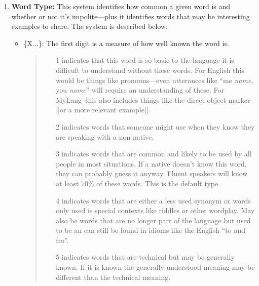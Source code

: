 \documentclass[oneside]{book}
\newcommand{\LanguageName}{MyLang}
\begin{document}
\begin{enumerate}
\begin{itemize}
(prep.) = preposition
\item
(pron.) = pronoun
\item
(sc.) = subordinating conjunction
\item
(sg.) = singular
\item
s/o = someone
\item
s/t = something
\item
(suf.) = suffix
\item
s/w = somewhere
\item
(v.) = verb
\item
(vi.) = intransitive verb
\item
(vt.) = transitive verb
\item
(vp.) = verb phrase
\end{itemize}
\item
\textbf{Word Type:}
This system identifies how common a given word is and whether or not it's impolite---plus it identifies words that may be interesting examples to share.
The system is described below:
\begin{itemize}
\item
\{X$\ldots$\}:
The first digit is a measure of how well known the word is.
\begin{quote}
\begin{enumerate}
\item[1] indicates that this word is so basic to the language it is difficult to understand without these words.
For English this would be things like pronouns---even utterances like ``me \emph{name}, you \emph{name}'' will require an understanding of these.
For \LanguageName\ this also includes things like the direct object marker [[or a more relevant example]].
\item[2] indicates words that someone might use when they know they are speaking with a non-native.
\item[3] indicates words that are common and likely to be used by all people in most situations.
If a native doesn't know this word, they can probably guess it anyway.
Fluent speakers will know at least 70\% of these words.
This is the default type.
\item[4] indicates words that are either a less used synonym or words only used is special contexts like riddles or other wordplay.
May also be words that are no longer part of the language but used to be an can still be found in idioms like the English ``to and fro''.
\item[5] indicates words that are technical but may be generally known.
If it is known the generally understood meaning may be different than the technical meaning.

\end{enumerate}
\end{quote}
\end{itemize}
\end{enumerate}
\end{document}
